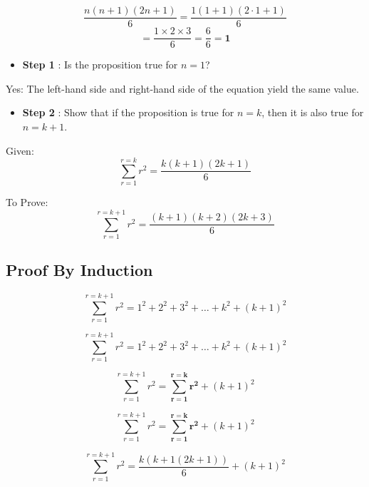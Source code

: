 \[ \frac{n(n+1)(2n+1)}{6}  = \frac{1(1+1)(2\cdot 1+1)}{6} \]
\[  = \frac{1\times 2 \times 3}{6} = \frac{6}{6}=\boldsymbol{1} \]



\begin{itemize}
	\item \textbf{Step 1} : Is the proposition true for $n = 1$? 
\end{itemize}
\bigskip
Yes: The left-hand side and right-hand side of the equation yield the same value.

\begin{itemize}
	\item \textbf{Step 2} : Show that if the proposition is true for $n=k$, then it is also true for $n=k+1$.
\end{itemize}
Given: \[ \sum_{r=1}^{r=k} r^2 = \frac{k(k+1)(2k+1)}{6} \]

To Prove: \[ \sum_{r=1}^{r=k+1} r^2 = \frac{(k+1)(k+2)(2k+3)}{6} \]



\subsection{Proof By Induction}



\[ \sum_{r=1}^{r=k+1} r^2 = 1^2 + 2^2 + 3^2 + \ldots + k^2 + (k+1)^2 \]






\[ \sum_{r=1}^{r=k+1} r^2 = 1^2 + 2^2 + 3^2 + \ldots + k^2 + (k+1)^2 \]

\[ \sum_{r=1}^{r=k+1} r^2 = \boldsymbol{\sum_{r=1}^{r=k} r^2} + (k+1)^2 \]



\[ \sum_{r=1}^{r=k+1} r^2 = \boldsymbol{\sum_{r=1}^{r=k} r^2} + (k+1)^2 \]

\[ \sum_{r=1}^{r=k+1} r^2 = \frac{k(k+1(2k+1
	))}{6} + (k+1)^2 \]

